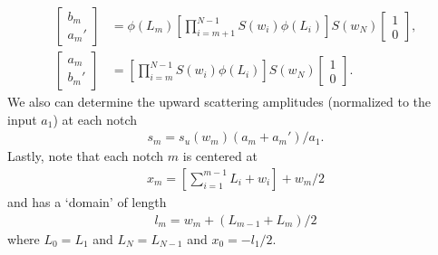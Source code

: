 \documentclass[10pt, letter, oneside,graphicx]{article}
\begin{document}
\begin{align*}
\left[ \begin{array}{c}
b_m \\ a_m'
\end{array} \right]
&=
\phi(L_m)
\left[
\prod_{i = m+1}^{N-1}
S(w_i)
\phi(L_i)
\right]
S(w_N)
\left[ \begin{array}{c}
1 \\ 0
\end{array} \right], \\
\left[ \begin{array}{c}
a_m \\ b_m'
\end{array} \right]
&=
\left[
\prod_{i = m}^{N-1}
S(w_i)
\phi(L_i)
\right]
S(w_N)
\left[ \begin{array}{c}
1 \\ 0
\end{array} \right].
\end{align*}
We also can determine the upward scattering amplitudes (normalized to the input $a_1$) at each notch
\begin{align*}
s_m = s_u(w_m)(a_m + a_m')/a_1.
\end{align*}
Lastly, note that each notch $m$ is centered at
\begin{align*}
x_m = \left[\sum_{i = 1}^{m-1} L_i + w_i\right] + w_m/2
\end{align*}
and has a `domain' of length
\begin{align*}
l_m = w_m + (L_{m-1} + L_m)/2
\end{align*}
where $L_0 = L_1$ and $L_N = L_{N-1}$ and $x_0 = -l_1/2$.
\end{document}
